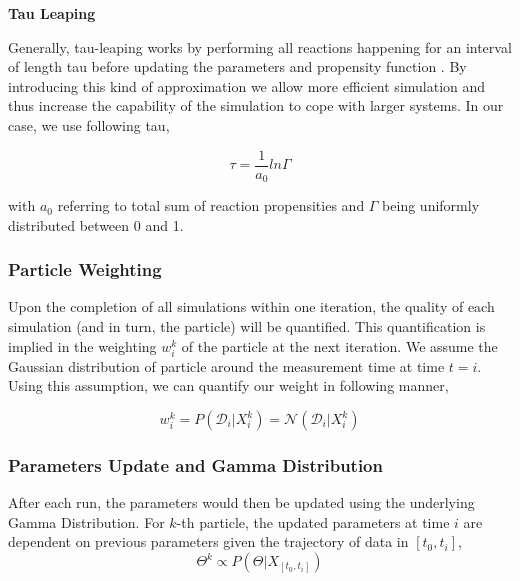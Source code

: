 \documentclass{bioinfo}
\begin{document}
\textbf{Tau Leaping}

Generally, tau-leaping works by performing all reactions happening for an interval of length tau before updating the parameters and propensity function \citep{Cao06}. By introducing this kind of approximation we allow more efficient simulation and thus increase the capability of the simulation to cope with larger systems. In our case, we use following tau,

\begin{equation}
\tau = \frac{1}{a_0} ln \Gamma\label{eq:15}
\end{equation}

with $a_0$ referring to total sum of reaction propensities and $\Gamma$ being uniformly distributed between 0 and 1. 

\subsubsection{Particle Weighting}

Upon the completion of all simulations within one iteration, the quality of each simulation (and in turn, the particle) will be quantified. This quantification is implied in the weighting $w_{i}^k$ of the particle at the next iteration. We assume the Gaussian distribution of particle around the measurement time at time $t=i$. Using this assumption, we can quantify our weight in following manner,

\begin{equation}
w_i^k = P(\mathcal{D}_i | X_i^k) = \mathcal{N}(\mathcal{D}_i | X_i^k)\label{eq:16}
\end{equation}



\subsubsection{Parameters Update and Gamma Distribution}

After each run, the parameters would then be updated using the underlying Gamma Distribution. For $k$-th particle, the updated parameters at time $i$ are dependent on previous parameters given the trajectory of data in $[t_0, t_i]$,\\

\begin{equation}
\Theta^k \propto P(\Theta | X_{[t_0, t_i]})\label{eq:17}
\end{equation}
\end{document}
